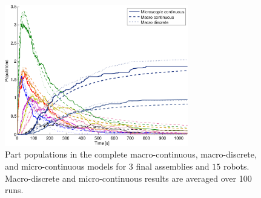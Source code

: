 


















\begin{figure}[t]
\centering
\includegraphics[width=8cm]{img/complete_model_results.pdf}
\caption{Part populations in the complete macro-continuous,
macro-discrete, and micro-continuous models for $3$ final assemblies
and $15$ robots.  Macro-discrete and micro-continuous results are
averaged over 100 runs.} \label{fig:img_complete_model_results}
\end{figure}

